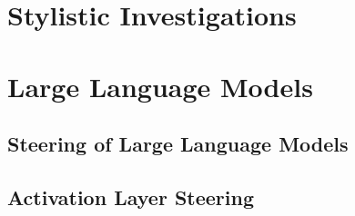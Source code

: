\section{Stylistic Investigations}
\label{sec:background:styleInvestigations}


\section{Large Language Models}
\label{sec:background:llm}


\subsection{Steering of Large Language Models}
\label{sec:background:llm:steering}


\subsection{Activation Layer Steering}
\label{sec:background:llm:activation}
